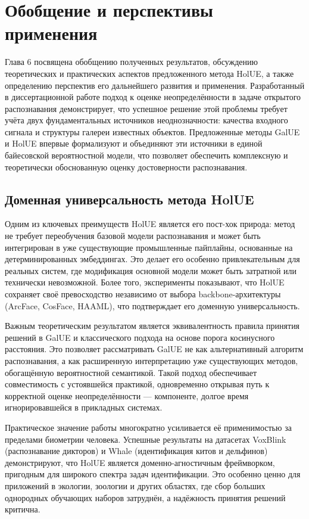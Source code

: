 \chapter{Обобщение и перспективы применения}\label{ch:generalization}
Глава 6 посвящена обобщению полученных результатов, обсуждению теоретических и практических аспектов предложенного метода HolUE, а также определению перспектив его дальнейшего развития и применения.
Разработанный в диссертационной работе подход к оценке неопределённости в задаче открытого распознавания демонстрирует, что успешное решение этой проблемы требует учёта двух фундаментальных источников неоднозначности: качества входного сигнала и структуры галереи известных объектов.
Предложенные методы GalUE и HolUE впервые формализуют и объединяют эти источники в единой байесовской вероятностной модели, что позволяет обеспечить комплексную и теоретически обоснованную оценку достоверности распознавания.
\section{Доменная универсальность метода HolUE}\label{sec:generalization/domain_agnostic}
Одним из ключевых преимуществ HolUE является его пост-хок природа: метод не требует переобучения базовой модели распознавания и может быть интегрирован в уже существующие промышленные пайплайны, основанные на детерминированных эмбеддингах.
Это делает его особенно привлекательным для реальных систем, где модификация основной модели может быть затратной или технически невозможной.
Более того, эксперименты показывают, что HolUE сохраняет своё превосходство независимо от выбора backbone-архитектуры (ArcFace, CosFace, HAAML), что подтверждает его доменную универсальность.

Важным теоретическим результатом является эквивалентность правила принятия решений в GalUE и классического подхода на основе порога косинусного расстояния.
Это позволяет рассматривать GalUE не как альтернативный алгоритм распознавания, а как расширенную интерпретацию уже существующих методов, обогащённую вероятностной семантикой.
Такой подход обеспечивает совместимость с устоявшейся практикой, одновременно открывая путь к корректной оценке неопределённости — компоненте, долгое время игнорировавшейся в прикладных системах.

Практическое значение работы многократно усиливается её применимостью за пределами биометрии человека.
Успешные результаты на датасетах VoxBlink (распознавание дикторов) и Whale (идентификация китов и дельфинов) демонстрируют, что HolUE является доменно-агностичным фреймворком, пригодным для широкого спектра задач идентификации.
Это особенно ценно для приложений в экологии, зоологии и других областях, где сбор больших однородных обучающих наборов затруднён, а надёжность принятия решений критична.
